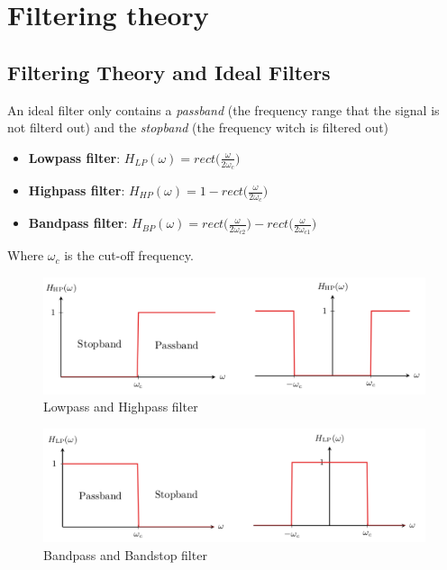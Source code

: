 \documentclass{article}
\begin{document}

\newpage
\section{Filtering theory}
\subsection{Filtering Theory and Ideal Filters}
An ideal filter only contains a \textit{passband} (the frequency range that the signal is not filterd out) 
and the \textit{stopband} (the frequency witch is filtered out)

\begin{itemize}
    \item \textbf{Lowpass filter}:
    $H_{LP}(\omega) = rect\big( \frac{\omega}{2\omega_c} \big)$
    \item \textbf{Highpass filter}:
    $H_{HP}(\omega) = 1-rect\big( \frac{\omega}{2\omega_c} \big)$
    \item \textbf{Bandpass filter}:
    $H_{BP}(\omega) = rect\big( \frac{\omega}{2\omega_{c2}} \big) - rect\big( \frac{\omega}{2\omega_{c1}} \big)$
\end{itemize}
Where $\omega_c$ is the cut-off frequency.

\begin{figure}[!h]
    \centering
    \includegraphics[width=12cm]{image/filter-lp-hp.pdf}
    \caption{Lowpass and Highpass filter}
    \label{fig:filter-lp-hp}
\end{figure}

\begin{figure}[!h]
    \centering
    \includegraphics[width=12cm]{image/filter-bp-bs.pdf}
    \caption{Bandpass and Bandstop filter}
    \label{fig:filter-bp-bs}
\end{figure}
\end{document}
